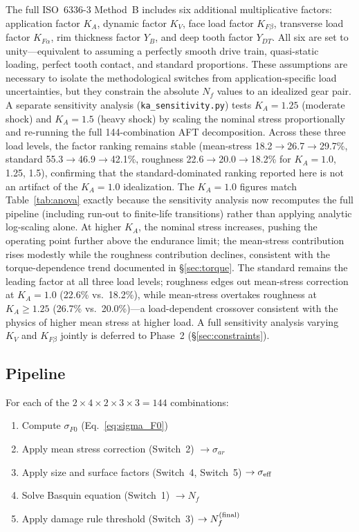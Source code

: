 \documentclass[twocolumn,12pt,a4paper]{article}
\begin{document}
The full ISO~6336-3 Method~B includes six additional multiplicative
factors: application factor $K_A$, dynamic factor $K_V$, face load
factor $K_{F\beta}$, transverse load factor $K_{F\alpha}$, rim
thickness factor $Y_B$, and deep tooth factor $Y_{DT}$. All six are set
to unity---equivalent to assuming a perfectly smooth drive train,
quasi-static loading, perfect tooth contact, and standard proportions.
These assumptions are necessary to isolate the methodological switches
from application-specific load uncertainties, but they constrain the
absolute $N_f$ values to an idealized gear pair. A separate sensitivity
analysis (\texttt{ka\_sensitivity.py}) tests $K_A = 1.25$ (moderate
shock) and $K_A = 1.5$ (heavy shock) by scaling the nominal stress
proportionally and re-running the full 144-combination AFT
decomposition. Across these three load levels, the factor ranking
remains stable (mean-stress 18.2$\rightarrow$26.7$\rightarrow$29.7\%,
standard 55.3$\rightarrow$46.9$\rightarrow$42.1\%, roughness
22.6$\rightarrow$20.0$\rightarrow$18.2\% for $K_A=1.0$, 1.25, 1.5),
confirming that the standard-dominated ranking reported here is not an
artifact of the $K_A=1.0$ idealization. The $K_A=1.0$ figures match
Table~\ref{tab:anova} exactly because the sensitivity analysis now
recomputes the full pipeline (including run-out to finite-life
transitions) rather than applying analytic log-scaling alone. At
higher $K_A$, the nominal stress increases,
pushing the operating point further above the endurance limit; the
mean-stress contribution rises modestly while the roughness
contribution declines, consistent with the torque-dependence trend
documented in \S\ref{sec:torque}. The standard remains the leading
factor at all three load levels; roughness edges out mean-stress
correction at $K_A=1.0$ (22.6\% vs.\ 18.2\%), while mean-stress
overtakes roughness at $K_A \geq 1.25$ (26.7\% vs.\ 20.0\%)---a
load-dependent crossover consistent with the physics of higher mean
stress at higher load. A full sensitivity analysis
varying $K_V$ and $K_{F\beta}$ jointly is deferred to Phase~2
(\S\ref{sec:constraints}).

\subsection{Pipeline}

For each of the $2\times4\times2\times3\times3 = 144$ combinations:
\begin{enumerate}
  \item Compute $\sigma_{F0}$ (Eq.~\ref{eq:sigma_F0})
  \item Apply mean stress correction (Switch~2) $\rightarrow \sigma_{ar}$
  \item Apply size and surface factors (Switch~4, Switch~5)
        $\rightarrow \sigma_{\rm eff}$
  \item Solve Basquin equation (Switch~1) $\rightarrow N_f$
  \item Apply damage rule threshold (Switch~3)
        $\rightarrow N_f^{\rm (final)}$
\end{enumerate}
\end{document}
